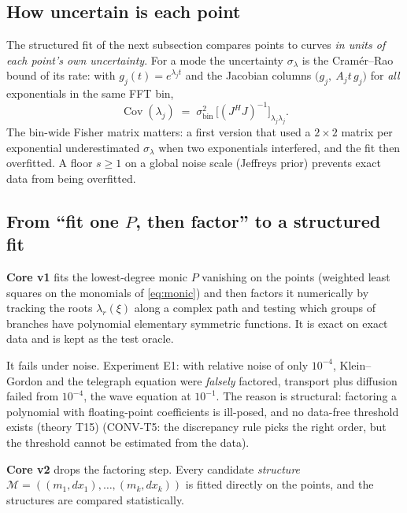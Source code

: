 \documentclass[11pt,a4paper]{article}
\theoremstyle{definition}
\newcommand{\thy}[1]{\textcolor{cG}{\textsf{\footnotesize(theory #1)}}}
\DeclareMathOperator{\Cov}{Cov}
\begin{document}
\subsection{How uncertain is each point}
The structured fit of the next subsection compares points to curves \emph{in units of each point's own uncertainty}. For a mode the uncertainty $\sigma_\lambda$ is the Cram\'er--Rao bound of its rate: with $g_j(t)=e^{\lambda_jt}$ and the Jacobian columns $\big(g_j,\ A_jt\,g_j\big)$ for \emph{all} exponentials in the same FFT bin,
\begin{equation}\label{eq:crb}
\Cov(\lambda_j)\;=\;\sigma_{\mathrm{bin}}^2\,\big[(J^{H}J)^{-1}\big]_{\lambda_j\lambda_j}.
\end{equation}
The bin-wide Fisher matrix matters: a first version that used a $2\times2$ matrix per exponential underestimated $\sigma_\lambda$ when two exponentials interfered, and the fit then overfitted. A floor $s\ge1$ on a global noise scale (Jeffreys prior) prevents exact data from being overfitted.

\subsection{From ``fit one $P$, then factor'' to a structured fit}\label{sec:structfit}
\textbf{Core v1} fits the lowest-degree monic $P$ vanishing on the points (weighted least squares on the monomials of \eqref{eq:monic}) and then factors it numerically by tracking the roots $\lambda_r(\xi)$ along a complex path and testing which groups of branches have polynomial elementary symmetric functions. It is exact on exact data and is kept as the test oracle.

It fails under noise. Experiment E1: with relative noise of only $10^{-4}$, Klein--Gordon and the telegraph equation were \emph{falsely} factored, transport plus diffusion failed from $10^{-4}$, the wave equation at $10^{-1}$. The reason is structural: factoring a polynomial with floating-point coefficients is ill-posed, and no data-free threshold exists \thy{T15} (CONV-T5: the discrepancy rule picks the right order, but the threshold cannot be estimated from the data).

\textbf{Core v2} drops the factoring step. Every candidate \emph{structure} $\mathcal M=((m_1,dx_1),\dots,(m_k,dx_k))$ is fitted directly on the points, and the structures are compared statistically.
\end{document}
